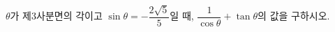 $\theta$가 제$3$사분면의 각이고 $\sin\theta=-\dfrac{2\sqrt{5}}{5}$일 때, $\dfrac{1}{\cos\theta}+\tan\theta$의 값을 구하시오.
